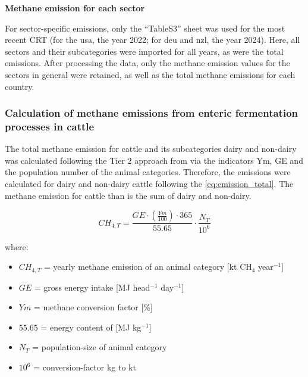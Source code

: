 \textbf{Methane emission for each sector}

\noindent For sector-specific emissions, only the “TableS3” sheet was used for the most recent CRT (for the \acrshort{usa}, the year 2022; for \acrshort{deu} and \acrshort{nzl}, the year 2024). Here, all sectors and their subcategories were imported for all years, as were the total emissions. After processing the data, only the methane emission values for the sectors in general were retained, as well as the total methane emissions for each country.

\subsubsection{Calculation of methane emissions from enteric fermentation processes in cattle}
\label{sec:methane_emis_calc_method}

The total methane emission for cattle and its subcategories dairy and non-dairy was calculated following the Tier 2 approach from \textcite{IPCC_2006_complete_Guidline} via the indicators \acrshort{Ym}, \acrshort{GE} and the population number of the animal categories. Therefore, the  emissions were calculated for dairy and non-dairy cattle following the \cref{eq:emission_total}. The methane emission for cattle than is the sum of dairy and non-dairy.


\begin{equation}
CH_{4,T} = \frac{GE\cdot (\frac{Ym}{100})\cdot 365}{55.65}\cdot \frac{N_T}{10^6}
	\label{eq:emission_total}
\end{equation}

\noindent where:
\begin{itemize}
	\item $CH_{4, T}$ = yearly methane emission of an animal category [kt CH$_4$ year$^{-1}$]
	\item $GE$ = gross energy intake [MJ head$^{-1}$ day$^{-1}$]
	\item $Ym$ = methane conversion factor [\%]
	\item $55.65$ = energy content of  [MJ kg$^{-1}$]
	\item $N_T$ = population-size of animal category
	\item $10^6$ = conversion-factor kg to kt
\end{itemize}



